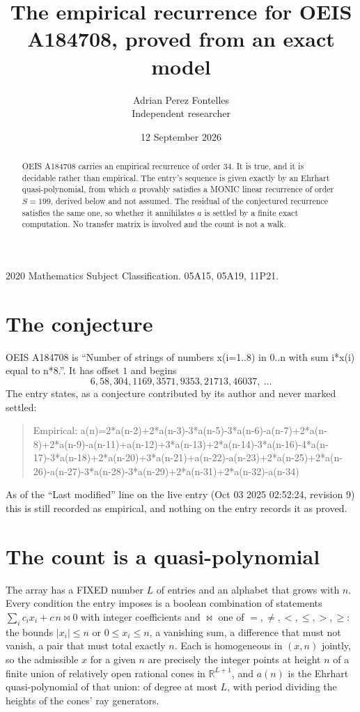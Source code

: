 \documentclass[11pt,a4paper]{article}
\title{The empirical recurrence for OEIS A184708, proved from an exact model}
\author{Adrian Perez Fontelles\\ \small Independent researcher}
\date{12 September 2026}
\theoremstyle{plain}
\theoremstyle{definition}
\begin{document}
\maketitle

\begin{abstract}
OEIS A184708 carries an empirical recurrence of order $34$. It is true, and it is
decidable rather than empirical. The entry's sequence is given exactly by an Ehrhart quasi-polynomial, from
which $a$ provably satisfies a MONIC linear recurrence of order $S=199$, derived below and not
assumed. The residual of the conjectured recurrence satisfies the same one, so whether it
annihilates $a$ is settled by a finite exact computation. No transfer matrix is involved and
the count is not a walk.
\end{abstract}

\noindent\small 2020 Mathematics Subject Classification. 05A15, 05A19, 11P21.\normalsize

\section{The conjecture}

OEIS A184708 is ``Number of strings of numbers x(i=1..8) in 0..n with sum i*x(i) equal to n*8.''. It has offset $1$ and begins
\[
6, 58, 304, 1169, 3571, 9353, 21713, 46037,\ \dots
\]
The entry states, as a conjecture contributed by its author and never marked settled:
\begin{quote}
Empirical: a(n)=2*a(n-2)+2*a(n-3)-3*a(n-5)-3*a(n-6)-a(n-7)+2*a(n-8)+2*a(n-9)-a(n-11)+a(n-12)+3*a(n-13)+2*a(n-14)-3*a(n-16)-4*a(n-17)-3*a(n-18)+2*a(n-20)+3*a(n-21)+a(n-22)-a(n-23)+2*a(n-25)+2*a(n-26)-a(n-27)-3*a(n-28)-3*a(n-29)+2*a(n-31)+2*a(n-32)-a(n-34)
\end{quote}
As of the ``Last modified'' line on the live entry (Oct 03 2025 02:52:24, revision 9)
this is still recorded as empirical, and nothing on the entry records it as proved.

\section{The count is a quasi-polynomial}

The array has a FIXED number $L$ of entries and an alphabet that grows with $n$. Every
condition the entry imposes is a boolean combination of statements
$\sum_i c_ix_i + c\,n \bowtie 0$ with integer coefficients and $\bowtie$ one of
$=,\ne,<,\le,>,\ge$: the bounds $|x_i|\le n$ or $0\le x_i\le n$, a vanishing sum, a difference
that must not vanish, a pair that must total exactly $n$. Each is homogeneous in $(x,n)$
jointly, so the admissible $x$ for a given $n$ are precisely the integer points at height $n$
of a finite union of relatively open rational cones in $\mathbb{R}^{L+1}$, and $a(n)$ is
the Ehrhart quasi-polynomial of that union: of degree at most $L$, with period dividing the
heights of the cones' ray generators.
\end{document}
